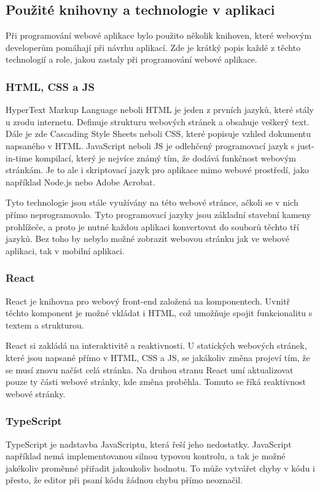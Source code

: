 \subsection{Použité knihovny a technologie v aplikaci}
Při programování webové aplikace bylo použito několik knihoven, které webovým developerům pomáhají při návrhu aplikací. Zde je krátký popis každé z těchto technologií a role, jakou zastaly při programování webové aplikace.

\subsubsection{HTML, CSS a JS}
HyperText Markup Language neboli HTML je jeden z prvních jazyků, které stály u zrodu internetu. Definuje strukturu webových stránek a obsahuje veškerý text. Dále je zde Cascading Style Sheets neboli CSS, které popisuje vzhled dokumentu napsaného v HTML. JavaScript neboli JS je odlehčený programovací jazyk s just-in-time kompilací, který je nejvíce známý tím, že dodává funkčnost webovým stránkám. Je to ale i skriptovací jazyk pro aplikace mimo webové prostředí, jako například Node.js nebo Adobe Acrobat.
\cite{HTMLweb, CSSweb, JSweb}

Tyto technologie jsou stále využívány na této webové stránce, ačkoli se v nich přímo neprogramovalo. Tyto programovací jazyky jsou základní stavební kameny prohlížeče, a proto je nutné každou aplikaci konvertovat do souborů těchto tří jazyků. Bez toho by nebylo možné zobrazit webovou stránku jak ve webové aplikaci, tak v mobilní aplikaci.

\subsubsection{React}\label{sec:React}
React je knihovna pro webový front-end založená na komponentech. Uvnitř těchto komponent je možné vkládat i HTML, což umožňuje spojit funkcionalitu s textem a strukturou.

React si zakládá na interaktivitě a reaktivnosti. U statických webových stránek, které jsou napsané přímo v HTML, CSS a JS, se jakákoliv změna projeví tím, že se musí znovu načíst celá stránka. Na druhou stranu React umí aktualizovat pouze ty části webové stránky, kde změna proběhla. Tomuto se říká reaktivnost webové stránky.
\cite{ReactWeb}

\subsubsection{TypeScript}
TypeScript je nadstavba JavaScriptu, která řeší jeho nedostatky. JavaScript například nemá implementovanou silnou typovou kontrolu, a tak je možné jakékoliv proměnné přiřadit jakoukoliv hodnotu. To může vytvářet chyby v kódu i přesto, že editor při psaní kódu žádnou chybu přímo neoznačil.

